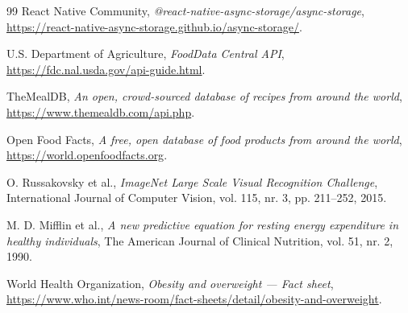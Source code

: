 \documentclass[12pt, a4paper, twoside]{report}
\numberwithin{equation}{section}
\begin{document}
\begin{thebibliography}{99}
React Native Community, \textit{@react-native-async-storage/async-storage},
\url{https://react-native-async-storage.github.io/async-storage/}.

U.S. Department of Agriculture, \textit{FoodData Central API},
\url{https://fdc.nal.usda.gov/api-guide.html}.

TheMealDB, \textit{An open, crowd-sourced database of recipes from around the world},
\url{https://www.themealdb.com/api.php}.

Open Food Facts, \textit{A free, open database of food products from around the world},
\url{https://world.openfoodfacts.org}.

O. Russakovsky et al., \textit{ImageNet Large Scale Visual Recognition Challenge},
International Journal of Computer Vision, vol. 115, nr. 3, pp. 211--252, 2015.

M. D. Mifflin et al., \textit{A new predictive equation for resting energy expenditure in
healthy individuals}, The American Journal of Clinical Nutrition, vol. 51, nr. 2, 1990.

World Health Organization, \textit{Obesity and overweight --- Fact sheet},
\url{https://www.who.int/news-room/fact-sheets/detail/obesity-and-overweight}.

\end{thebibliography}

\newpage
\listoftables
{}
\listoffigures
{}
\end{document}
